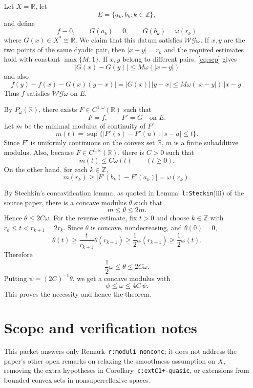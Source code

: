 \documentclass[11pt]{article}
\newcommand{\R}{\mathbb R}
\begin{document}
Let \(X=\R\), let
\[
        E=\{a_k,b_k:k\in\mathbb Z\},
\]
and define
\[
        f\equiv0,\qquad
        G(a_k)=0,\qquad
        G(b_k)=\omega(r_k)
\]
where \(G(x)\in X^*\cong\R\).  We claim that this datum satisfies
\(\mathcal{W G}\omega\).  If \(x,y\) are the two points of the same dyadic
pair, then \(|x-y|=r_k\) and the required estimates hold with constant
\(\max\{M,1\}\).  If \(x,y\) belong to different pairs, \eqref{eq:sep} gives
\[
        |G(x)-G(y)|\leq M\omega(|x-y|)
\]
and also
\[
        |f(y)-f(x)-G(x)(y-x)|
        = |G(x)|\,|y-x|
        \leq M\omega(|x-y|)\,|x-y|.
\]
Thus \(f\) satisfies \(\mathcal{W G}\omega\) on \(E\).

By \(P_\omega(\R)\), there exists \(F\in C^{1,\omega}(\R)\) such that
\[
        F=f,\qquad F'=G\quad\text{on }E .
\]
Let \(m\) be the minimal modulus of continuity of \(F'\):
\[
        m(t)=\sup\{|F'(s)-F'(u)|: |s-u|\leq t\}.
\]
Since \(F'\) is uniformly continuous on the convex set \(\R\), \(m\) is a
finite subadditive modulus.  Also, because \(F\in C^{1,\omega}(\R)\), there is
\(C>0\) such that
\[
        m(t)\leq C\omega(t)\qquad(t\geq0).
\]
On the other hand, for each \(k\in\mathbb Z\),
\[
        m(r_k)\geq |F'(b_k)-F'(a_k)|=\omega(r_k).
\]

By Stechkin's concavification lemma, as quoted in Lemma~\texttt{l:Steckin}(iii)
of the source paper, there is a concave modulus \(\theta\) such that
\[
        m\leq\theta\leq2m .
\]
Hence \(\theta\leq2C\omega\).  For the reverse estimate, fix \(t>0\) and
choose \(k\in\mathbb Z\) with \(r_k\leq t<r_{k+1}=2r_k\).  Since
\(\theta\) is concave, nondecreasing, and \(\theta(0)=0\),
\[
        \theta(t)\geq \frac{t}{r_{k+1}}\theta(r_{k+1})
        \geq \frac{1}{2}\omega(r_{k+1})
        \geq \frac{1}{2}\omega(t).
\]
Therefore
\[
        \frac{1}{2}\omega\leq\theta\leq2C\omega .
\]
Putting \(\psi=(2C)^{-1}\theta\), we get a concave modulus with
\[
        \psi\leq\omega\leq4C\,\psi .
\]
This proves the necessity and hence the theorem.

\section*{Scope and verification notes}

This packet answers only Remark~\texttt{r:moduli\_nonconc}; it does not address
the paper's other open remarks on relaxing the smoothness assumption on \(X\),
removing the extra hypotheses in Corollary~\texttt{c:extC1+-quasic}, or
extensions from bounded convex sets in nonsuperreflexive spaces.
\end{document}
